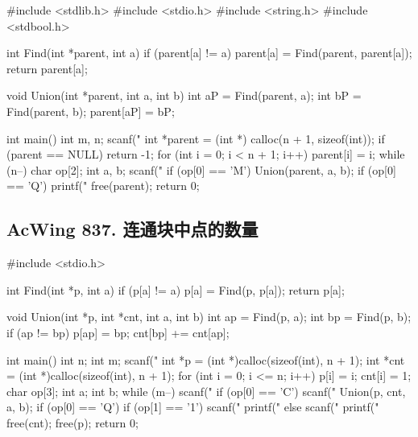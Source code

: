 \begin{mycpptwocol}[合并集合]
#include <stdlib.h>
#include <stdio.h>
#include <string.h>
#include <stdbool.h>

int Find(int *parent, int a)
{
	if (parent[a] != a) {
		parent[a] = Find(parent, parent[a]);
	}
	return parent[a];
}

void Union(int *parent, int a, int b)
{
	int aP = Find(parent, a);
	int bP = Find(parent, b);
	parent[aP] = bP;
}

int main()
{
	int m, n;
	scanf("%
	int *parent = (int *) calloc(n + 1, sizeof(int));
	if (parent == NULL) {
		return -1;
	}
	for (int i = 0; i < n + 1; i++) {
		parent[i] = i;
	}
	while (n--) {
		char op[2];
		int a, b;
		scanf("%
		if (op[0] == 'M') {
			Union(parent, a, b);
		}
		if (op[0] == 'Q') {
			printf("%
		}
	}
	free(parent);
	return 0;
}
\end{mycpptwocol}
\subsection{AcWing 837. 连通块中点的数量}

\begin{mycpptwocol}[]
#include <stdio.h>

int Find(int *p, int a)
{
    if (p[a] != a) {
        p[a] = Find(p, p[a]);
    }
    return p[a];
}

void Union(int *p, int *cnt, int a, int b)
{
    int ap = Find(p, a);
    int bp = Find(p, b);
    if (ap != bp) {
        p[ap] = bp;
        cnt[bp] += cnt[ap];
    }
}

int main()
{
    int n;
    int m;
    scanf("%
    int *p = (int *)calloc(sizeof(int), n + 1);
    int *cnt = (int *)calloc(sizeof(int), n + 1);
    for (int i = 0; i <= n; i++) {
        p[i] = i;
        cnt[i] = 1;
    }
    char op[3];
    int a;
    int b;
    while (m--) {
        scanf("%
        if (op[0] == 'C') {
            scanf("%
            Union(p, cnt, a, b);
        }
        if (op[0] == 'Q') {
            if (op[1] == '1') {
                scanf("%
                printf("%
            } else {
                scanf("%
                printf("%
            }
        }
    }
    free(cnt);
    free(p);
    return 0;
}
\end{mycpptwocol}

